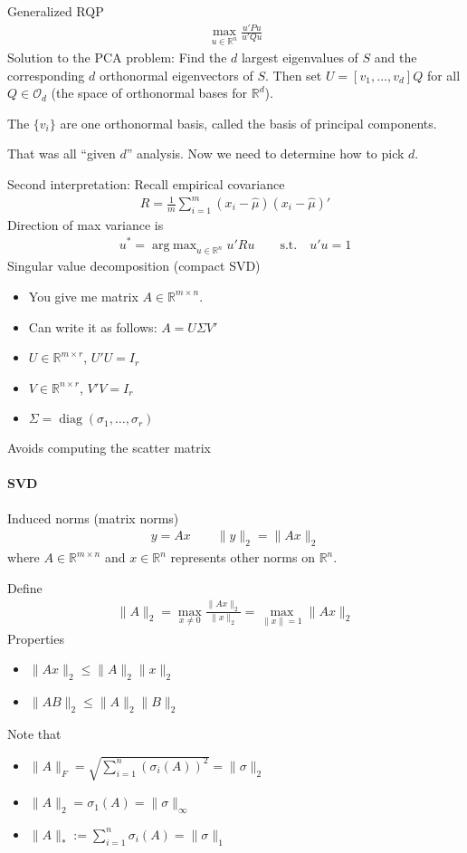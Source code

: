 \documentclass[12pt]{article}
\numberwithin{equation}{section} %
\theoremstyle{plain}
\theoremstyle{definition}
\theoremstyle{remark}
\newcommand{\diag}{\operatorname{diag}}
\newcommand{\calO}{\mathcal{O}}
\newcommand{\R}{\mathbb{R}}
\newcommand{\Rn}{\mathbb{R}^n}
\DeclareMathOperator*{\argmax}{arg\;max}
\newcommand{\sumin}{\sum^n_{i=1}}
\begin{document}
Generalized RQP
\begin{align*}
  \max_{u\in\R^{n}} \frac{u'Pu}{u'Qu}
\end{align*}
Solution to the PCA problem:
Find the $d$ largest eigenvalues of $S$ and the corresponding $d$
orthonormal eigenvectors of $S$.
Then set $U=[v_1,\ldots,v_d]Q$ for all $Q\in \calO_d$ (the space of
orthonormal bases for $\R^d$).

The $\{v_i\}$ are one orthonormal basis, called the basis of principal
components.

That was all ``given $d$'' analysis.
Now we need to determine how to pick $d$.

Second interpretation:
Recall empirical covariance
\begin{align*}
  R=
  \frac{1}{m}
  \sum_{i=1}^m (x_i-\hat{\mu})(x_i-\hat{\mu})'
\end{align*}
Direction of max variance is
\begin{align*}
  u^* = \argmax_{u\in\Rn} u'Ru
  \qquad\text{s.t.}\quad
  u'u=1
\end{align*}
Singular value decomposition (compact SVD)
\begin{itemize}
  \item You give me matrix $A\in\R^{m\times n}$.
  \item Can write it as follows: $A=U\Sigma V'$
  \item $U\in \R^{m\times r}$, $U'U=I_r$
  \item $V\in\R^{n\times r}$, $V'V=I_r$
  \item $\Sigma=\diag(\sigma_1,\ldots,\sigma_r)$
\end{itemize}
Avoids computing the scatter matrix


\paragraph{SVD}
Induced norms (matrix norms)
\begin{align*}
  y=Ax
  \qquad
  \lVert y\rVert_2
  =
  \lVert Ax\rVert_2
\end{align*}
where $A\in\R^{m\times n}$ and $x\in\Rn$ represents other norms on
$\Rn$.

Define
\begin{align*}
  \lVert A\rVert_2
  =
  \max_{x\neq 0}
  \frac{\lVert Ax\rVert_2}{\lVert x\rVert_2}
  =
  \max_{\lVert x\rVert=1}
  \lVert Ax\rVert_2
\end{align*}
Properties
\begin{itemize}
  \item $\lVert Ax\rVert_2\leq \lVert A\rVert_2\lVert x\rVert_2$
  \item $\lVert AB\rVert_2\leq \lVert A\rVert_2\lVert B\rVert_2$
\end{itemize}
Note that
\begin{itemize}
  \item
    $\lVert A\rVert_F=\sqrt{\sumin (\sigma_i(A))^2}=\lVert
    \sigma\rVert_2$
  \item $\lVert A\rVert_2=\sigma_1(A) = \lVert\sigma\rVert_\infty$
  \item $\lVert A\rVert_*:=\sumin \sigma_i(A)=\lVert\sigma\rVert_1$
\end{itemize}
\end{document}
